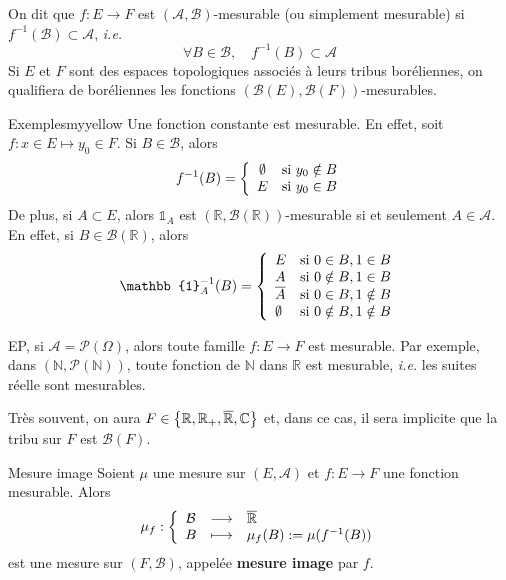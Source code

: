     \begin{defi}{}{}
        On dit que $f : E \to F$ est $(\mathcal{A}, \mathcal{B})$-mesurable (ou simplement mesurable) si $f^{-1}(\mathcal{B}) \subset \mathcal{A}$, \textit{i.e.} 
        \[ \forall B \in \mathcal{B}, \quad f^{-1}(B) \subset \mathcal{A} \]
        Si $E$ et $F$ sont des espaces topologiques associés à leurs tribus boréliennes, on qualifiera de boréliennes les fonctions $\left(\mathcal{B}(E), \mathcal{B}(F)\right)$-mesurables.
    \end{defi}

    \begin{omed}{Exemples}{myyellow}
        Une fonction constante est mesurable. En effet, soit $f : x \in E \mapsto y_0 \in F$. Si $B \in \mathcal{B}$, alors 
        \[ f^{-1}(B) = \sisi{\emptyset}{y_0 \notin B}{E}{y_0 \in B} \]  
        De plus, si $A \subset E$, alors $\mathbb{1}_A$ est $(\mathbb{R}, \mathcal{B}(\mathbb{R}))$-mesurable si et seulement $A \in \mathcal{A}$. En effet, si $B \in \mathcal{B}(\mathbb{R})$, alors 
        \[ \mathbb{1}_A^{-1}(B) = \left\{ \begin{array}{ll}
            E & \text{si } 0 \in B, 1 \in B \\
            A & \text{si } 0 \notin B, 1 \in B \\
            \barr{A} & \text{si } 0 \in B, 1 \notin B \\
            \emptyset & \text{si } 0 \notin B, 1 \notin B
        \end{array} \right. \]   
    \end{omed}

    EP, si $\mathcal{A} = \mathcal{P}(\Omega)$, alors toute famille $f : E \to F$ est mesurable. Par exemple, dans $(\mathbb{N}, \mathcal{P}(\mathbb{N}))$, toute fonction de $\mathbb{N}$ dans $\mathbb{R}$ est mesurable, \textit{i.e.} les suites réelle sont mesurables. 

    Très souvent, on aura $F \in \left\{\mathbb{R}, \mathbb{R}_+, \overline{\mathbb{R}}, \mathbb{C}\right\}$ et, dans ce cas, il sera implicite que la tribu sur $F$ est $\mathcal{B}(F)$.

    \begin{defi}{Mesure image}
        Soient $\mu$ une mesure sur $(E,\mathcal{A})$ et $f : E \to F$ une fonction mesurable. Alors 
        \[ \fonction{\mu_f}{\mathcal{B}}{\barr{\mathbb{R}}}{B}{\mu_f(B) := \mu(f^{-1}(B))} \]  
        est une mesure sur $(F,\mathcal{B})$, appelée \textbf{mesure image} par $f$.
    \end{defi}

